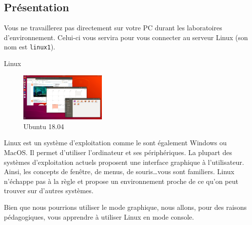 \documentclass[a4paper,11pt]{style-esi/td}
\begin{document}

	\subsection{Présentation}
	Vous ne travaillerez pas directement sur votre PC durant les laboratoires d'environnement. 
	Celui-ci vous servira pour vous connecter au serveur Linux
	(son nom est \verb_linux1_).

	\begin{theorie}{Linux}
		\begin{figure} 
			\vspace{-1em}
			\flushright
			\includegraphics[width=0.38\textwidth]{images/ubuntu}
			\caption{Ubuntu 18.04}
			\vspace{-1em}
		\end{figure} 
		Linux est un système d'exploitation comme le sont également Windows ou MacOS. 
		Il permet d'utiliser l'ordinateur et ses périphériques. 
		La plupart des systèmes d'exploitation actuels proposent 
		une interface graphique à l'utilisateur. 
		Ainsi, les concepts de fenêtre, de menus, de souris\dots vous sont familiers. 
		Linux n'échappe pas à la règle et propose un environnement 
		proche de ce qu'on peut trouver sur d'autres systèmes.
	\end{theorie}

	Bien que nous pourrions utiliser le mode graphique, 
	nous allons, pour des raisons pédagogiques, 
	vous apprendre à utiliser Linux en mode console.
\end{document}
